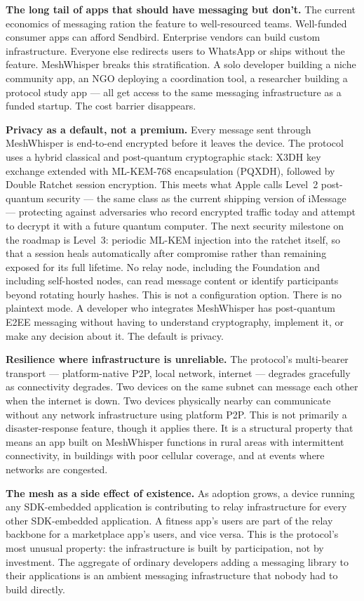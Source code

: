 \documentclass[11pt, a4paper]{article}
\begin{document}
\textbf{The long tail of apps that should have messaging but don't.} The current economics of messaging ration the feature to well-resourced teams. Well-funded consumer apps can afford Sendbird. Enterprise vendors can build custom infrastructure. Everyone else redirects users to WhatsApp or ships without the feature. MeshWhisper breaks this stratification. A solo developer building a niche community app, an NGO deploying a coordination tool, a researcher building a protocol study app — all get access to the same messaging infrastructure as a funded startup. The cost barrier disappears.

\textbf{Privacy as a default, not a premium.} Every message sent through MeshWhisper is end-to-end encrypted before it leaves the device. The protocol uses a hybrid classical and post-quantum cryptographic stack: X3DH key exchange extended with ML-KEM-768 encapsulation (PQXDH), followed by Double Ratchet session encryption. This meets what Apple calls Level~2 post-quantum security — the same class as the current shipping version of iMessage — protecting against adversaries who record encrypted traffic today and attempt to decrypt it with a future quantum computer. The next security milestone on the roadmap is Level~3: periodic ML-KEM injection into the ratchet itself, so that a session heals automatically after compromise rather than remaining exposed for its full lifetime. No relay node, including the Foundation and including self-hosted nodes, can read message content or identify participants beyond rotating hourly hashes. This is not a configuration option. There is no plaintext mode. A developer who integrates MeshWhisper has post-quantum E2EE messaging without having to understand cryptography, implement it, or make any decision about it. The default is privacy.

\textbf{Resilience where infrastructure is unreliable.} The protocol's multi-bearer transport — platform-native P2P, local network, internet — degrades gracefully as connectivity degrades. Two devices on the same subnet can message each other when the internet is down. Two devices physically nearby can communicate without any network infrastructure using platform P2P. This is not primarily a disaster-response feature, though it applies there. It is a structural property that means an app built on MeshWhisper functions in rural areas with intermittent connectivity, in buildings with poor cellular coverage, and at events where networks are congested.

\textbf{The mesh as a side effect of existence.} As adoption grows, a device running any SDK-embedded application is contributing to relay infrastructure for every other SDK-embedded application. A fitness app's users are part of the relay backbone for a marketplace app's users, and vice versa. This is the protocol's most unusual property: the infrastructure is built by participation, not by investment. The aggregate of ordinary developers adding a messaging library to their applications is an ambient messaging infrastructure that nobody had to build directly.
\end{document}
